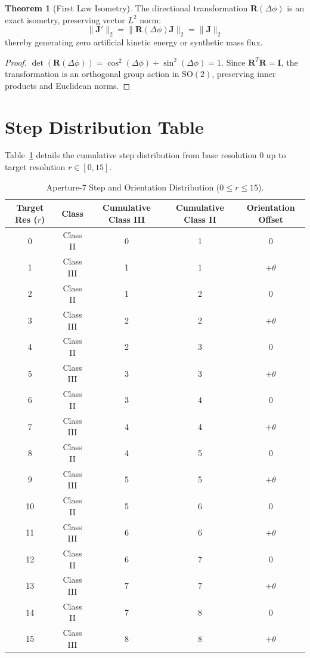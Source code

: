 \documentclass[11pt,a4paper]{article}
\theoremstyle{definition}
\newtheorem{theorem}{Theorem}
\begin{document}
\begin{theorem}[First Law Isometry]
The directional transformation $\mathbf{R}(\Delta \phi)$ is an exact isometry, preserving vector $L^2$ norm:
\begin{equation}
\|\mathbf{J}'\|_2 = \|\mathbf{R}(\Delta \phi)\mathbf{J}\|_2 = \|\mathbf{J}\|_2
\end{equation}
thereby generating zero artificial kinetic energy or synthetic mass flux.
\end{theorem}
\begin{proof}
$\det(\mathbf{R}(\Delta \phi)) = \cos^2(\Delta \phi) + \sin^2(\Delta \phi) = 1$. Since $\mathbf{R}^T \mathbf{R} = \mathbf{I}$, the transformation is an orthogonal group action in $\mathrm{SO}(2)$, preserving inner products and Euclidean norms.
\end{proof}

\section{Step Distribution Table}

Table~\ref{tab:steps} details the cumulative step distribution from base resolution $0$ up to target resolution $r \in [0, 15]$.

\begin{table}[htbp]
\centering
\small
\begin{tabular}{ccccc}
\toprule
\textbf{Target Res ($r$)} & \textbf{Class} & \textbf{Cumulative Class III} & \textbf{Cumulative Class II} & \textbf{Orientation Offset} \\
\midrule
0  & Class II  & 0 & 1 & $0$ \\
1  & Class III & 1 & 1 & $+\theta$ \\
2  & Class II  & 1 & 2 & $0$ \\
3  & Class III & 2 & 2 & $+\theta$ \\
4  & Class II  & 2 & 3 & $0$ \\
5  & Class III & 3 & 3 & $+\theta$ \\
6  & Class II  & 3 & 4 & $0$ \\
7  & Class III & 4 & 4 & $+\theta$ \\
8  & Class II  & 4 & 5 & $0$ \\
9  & Class III & 5 & 5 & $+\theta$ \\
10 & Class II  & 5 & 6 & $0$ \\
11 & Class III & 6 & 6 & $+\theta$ \\
12 & Class II  & 6 & 7 & $0$ \\
13 & Class III & 7 & 7 & $+\theta$ \\
14 & Class II  & 7 & 8 & $0$ \\
15 & Class III & 8 & 8 & $+\theta$ \\
\bottomrule
\end{tabular}
\caption{Aperture-7 Step and Orientation Distribution ($0 \le r \le 15$).}
\label{tab:steps}
\end{table}
\end{document}
